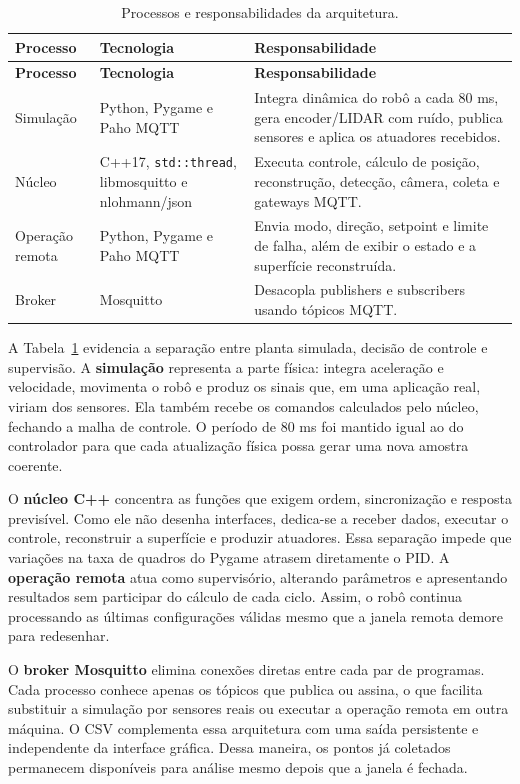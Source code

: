 \documentclass[12pt,a4paper]{article}
\begin{document}
\begin{longtable}{p{3.2cm}p{4.2cm}p{6.5cm}}
\caption{Processos e responsabilidades da arquitetura.}
\label{tab:processos}\\
\toprule
\textbf{Processo} & \textbf{Tecnologia} & \textbf{Responsabilidade} \\
\midrule
\endfirsthead
\toprule
\textbf{Processo} & \textbf{Tecnologia} & \textbf{Responsabilidade} \\
\midrule
\endhead
Simulação & Python, Pygame e Paho MQTT & Integra dinâmica do robô a cada 80 ms, gera encoder/LIDAR com ruído, publica sensores e aplica os atuadores recebidos. \\
Núcleo & C++17, \texttt{std::thread}, libmosquitto e nlohmann/json & Executa controle, cálculo de posição, reconstrução, detecção, câmera, coleta e gateways MQTT. \\
Operação remota & Python, Pygame e Paho MQTT & Envia modo, direção, setpoint e limite de falha, além de exibir o estado e a superfície reconstruída. \\
Broker & Mosquitto & Desacopla publishers e subscribers usando tópicos MQTT. \\
\bottomrule
\end{longtable}

A Tabela~\ref{tab:processos} evidencia a separação entre planta simulada, decisão de controle e supervisão. A \textbf{simulação} representa a parte física: integra aceleração e velocidade, movimenta o robô e produz os sinais que, em uma aplicação real, viriam dos sensores. Ela também recebe os comandos calculados pelo núcleo, fechando a malha de controle. O período de 80 ms foi mantido igual ao do controlador para que cada atualização física possa gerar uma nova amostra coerente.

O \textbf{núcleo C++} concentra as funções que exigem ordem, sincronização e resposta previsível. Como ele não desenha interfaces, dedica-se a receber dados, executar o controle, reconstruir a superfície e produzir atuadores. Essa separação impede que variações na taxa de quadros do Pygame atrasem diretamente o PID. A \textbf{operação remota} atua como supervisório, alterando parâmetros e apresentando resultados sem participar do cálculo de cada ciclo. Assim, o robô continua processando as últimas configurações válidas mesmo que a janela remota demore para redesenhar.

O \textbf{broker Mosquitto} elimina conexões diretas entre cada par de programas. Cada processo conhece apenas os tópicos que publica ou assina, o que facilita substituir a simulação por sensores reais ou executar a operação remota em outra máquina. O CSV complementa essa arquitetura com uma saída persistente e independente da interface gráfica. Dessa maneira, os pontos já coletados permanecem disponíveis para análise mesmo depois que a janela é fechada.
\end{document}
